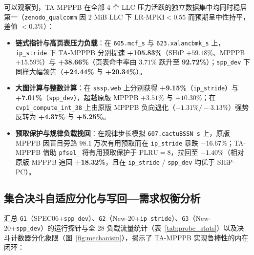 \documentclass[10.5pt,compsoc,UTF8]{CjC}
\begin{document}
可以观察到，TA-MPPPB 在全部 4 个 LLC 压力活跃的独立数据集中均同时稳居第一（\texttt{zenodo\_qualcomm} 因 2 MiB LLC 下 $\mathrm{LR\text{-}MPKI}<0.55$ 而预期呈中性持平，差值 $<0.3\%$）：
\begin{itemize}
  \item \textbf{链式指针与高页表压力负载}：在 \texttt{605.\allowbreak mcf\_s} 与 \texttt{623.\allowbreak xalancbmk\_s} 上，\texttt{ip\_stride} 下 TA-MPPPB 分别提速 \textbf{+105.83\%}（SHiP $+59.18\%$、MPPPB $+15.59\%$）与 \textbf{+38.66\%}（页表命中率由 $3.71\%$ 跃升至 \textbf{92.72\%}）；\texttt{spp\_dev} 下同样大幅领先（\textbf{+24.44\%} 与 \textbf{+20.34\%}）。
  \item \textbf{大图计算与整数计算}：在 \texttt{sssp.\allowbreak web} 上分别获得 \textbf{+9.15\%}（\texttt{ip\_stride}）与 \textbf{+7.01\%}（\texttt{spp\_dev}），超越原版 MPPPB $+3.51\%$ 与 $+10.30\%$；在 \texttt{cvp1\_\allowbreak compute\_\allowbreak int\_38} 上由原版 MPPPB 负向退化（$-1.31\% / -3.13\%$）强势反转为 \textbf{+4.37\%} 与 \textbf{+5.25\%}。
  \item \textbf{预取保护与规律负载挽回}：在规律步长模拟 \texttt{607.\allowbreak cactuBSSN\_s} 上，原版 MPPPB 因盲目旁路 $98.1$ 万次有用预取而在 \texttt{ip\_stride} 暴跌 $-16.67\%$；TA-MPPPB 借助 \texttt{pfsel\_} 将有用预取保护于 $\mathrm{PLRU}=8$，拉回至 $-1.40\%$（相对原版 MPPPB 追回 \textbf{+18.32\%}，且在 \texttt{ip\_stride} / \texttt{spp\_dev} 均优于 SHiP-PC）。
\end{itemize}

\subsection{集合决斗自适应分化与写回—需求权衡分析}

汇总 \texttt{G1}（SPEC06+\texttt{spp\_dev}）、\texttt{G2}（New-20+\texttt{ip\_stride}）、\texttt{G3}（New-20+\texttt{spp\_dev}）的运行探针与全 28 负载流量统计（表~\ref{tab:probe_stats}）以及决斗计数器分化象限（图~\ref{fig:mechanism}），揭示了 TA-MPPPB 实现鲁棒性的内在闭环：
\end{document}
